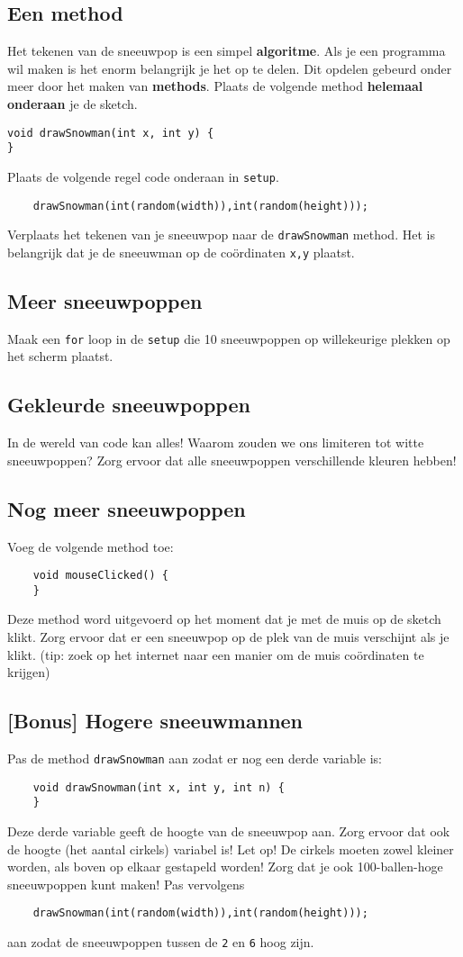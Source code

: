 \subsection{Een method}
Het tekenen van de sneeuwpop is een simpel \textbf{algoritme}. Als je een programma wil maken is het enorm belangrijk je het op te delen. Dit opdelen gebeurd onder meer door het maken van \textbf{methods}. Plaats de volgende method \textbf{helemaal onderaan} je de sketch.
\begin{lstlisting}
void drawSnowman(int x, int y) {
}
\end{lstlisting}
Plaats de volgende regel code onderaan in \texttt{setup}.
\begin{lstlisting}
    drawSnowman(int(random(width)),int(random(height)));
\end{lstlisting}
Verplaats het tekenen van je sneeuwpop naar de \texttt{drawSnowman} method. Het is belangrijk dat je de sneeuwman op de co\"ordinaten \texttt{x,y} plaatst.

\subsection{Meer sneeuwpoppen}
Maak een \texttt{for} loop in de \texttt{setup} die 10 sneeuwpoppen op willekeurige plekken op het scherm plaatst.
\subsection{Gekleurde sneeuwpoppen}
In de wereld van code kan alles! Waarom zouden we ons limiteren tot witte sneeuwpoppen?
Zorg ervoor dat alle sneeuwpoppen verschillende kleuren hebben!
\subsection{Nog meer sneeuwpoppen}
Voeg de volgende method toe:
\begin{lstlisting}
    void mouseClicked() {
    }
\end{lstlisting}
Deze method word uitgevoerd op het moment dat je met de muis op de sketch klikt. Zorg ervoor dat er een sneeuwpop op de plek van de muis verschijnt als je klikt. (tip: zoek op het internet naar een manier om de muis co\"ordinaten te krijgen)
\subsection{[Bonus] Hogere sneeuwmannen}
Pas de method \texttt{drawSnowman} aan zodat er nog een derde variable is:
\begin{lstlisting}
    void drawSnowman(int x, int y, int n) {
    }
\end{lstlisting}
Deze derde variable geeft de hoogte van de sneeuwpop aan. Zorg ervoor dat ook de hoogte (het aantal cirkels) variabel is! Let op! De cirkels moeten zowel kleiner worden, als boven op elkaar gestapeld worden! Zorg dat je ook 100-ballen-hoge sneeuwpoppen kunt maken! Pas vervolgens 
\begin{lstlisting}
    drawSnowman(int(random(width)),int(random(height)));
\end{lstlisting}
aan zodat de sneeuwpoppen tussen de \texttt{2} en \texttt{6} hoog zijn.
